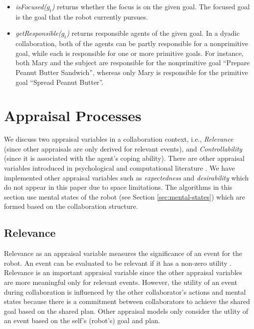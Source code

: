 \documentclass{article}
\begin{document}
\begin{itemize}[leftmargin=2pt]
  \item \textit{isFocused($g_t$)} returns whether the focus is on the given
  goal. The focused goal is the goal that the robot currently pursues.
  
  \item \textit{getResponsible($g_t$)} returns responsible agents of the given
  goal. In a dyadic collaboration, both of the agents can be partly responsible
  for a nonprimitive goal, while each is responsible for one or more primitive
  goals. For instance, both Mary and the subject are responsible for the
  nonprimitive goal ``Prepare Peanut Butter Sandwich'', whereas only Mary is
  responsible for the primitive goal ``Spread Peanut Butter''.
\end{itemize}

\vspace*{-3mm}
\section{Appraisal Processes}
\label{sec:appraisal-process}

We discuss two appraisal variables in a collaboration context, i.e.,
\textit{Relevance} (since other appraisals are only derived for relevant
events), and \textit{Controllability} (since it is associated with the agent's
coping ability). There are other appraisal variables introduced in psychological
\cite{scherer:appraisal-processes} and computational literature
\cite{gratch:domain-independent}. We have implemented other appraisal variables
such as \textit{expectedness} \cite{shayganfar:appraisal-short} and
\textit{desirability} \cite{shayganfar:emotional-awareness} which do not appear
in this paper due to space limitations. The algorithms in this section use
mental states of the robot (see Section \ref{sec:mental-states}) which are
formed based on the collaboration structure.

\subsection{Relevance}

Relevance as an appraisal variable measures the significance of an event for the
robot. An event can be evaluated to be relevant if it has a non-zero utility
\cite{marsella:ema-process-model}. Relevance is an important appraisal variable
since the other appraisal variables are more meaningful only for relevant
events. However, the utility of an event during collaboration is influenced by
the other collaborator's actions and mental states because there is a commitment
between collaborators to achieve the shared goal based on the shared plan. Other
appraisal models only consider the utlity of an event based on the self's
(robot's) goal and plan.
\end{document}
